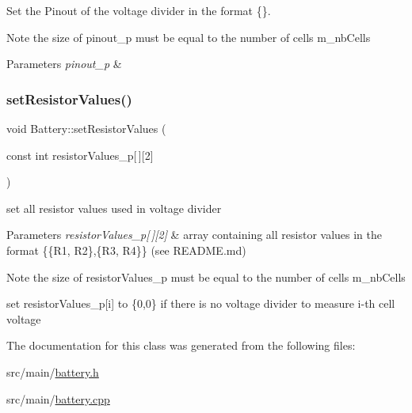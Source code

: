 Set the Pinout of the voltage divider in the format \{\}. 

\begin{DoxyNote}{Note}
the size of pinout\+\_\+p must be equal to the number of cells m\+\_\+nb\+Cells 
\end{DoxyNote}

\begin{DoxyParams}{Parameters}
{\em pinout\+\_\+p} & \\
\hline
\end{DoxyParams}
\mbox{\label{class_battery_afb257ecd2eab7ed446d15ea9e78cc074}} 
\subsubsection{\texorpdfstring{set\+Resistor\+Values()}{setResistorValues()}}
{\footnotesize\ttfamily void Battery\+::set\+Resistor\+Values (\begin{DoxyParamCaption}\item[{const int}]{resistor\+Values\+\_\+p\mbox{[}$\,$\mbox{]}\mbox{[}2\mbox{]} }\end{DoxyParamCaption})}



set all resistor values used in voltage divider 


\begin{DoxyParams}{Parameters}
{\em resistor\+Values\+\_\+p\mbox{[}$\,$\mbox{]}\mbox{[}2\mbox{]}} & array containing all resistor values in the format \{\{R1, R2\},\{R3, R4\}\} (see R\+E\+A\+D\+M\+E.\+md) \\
\hline
\end{DoxyParams}
\begin{DoxyNote}{Note}
the size of resistor\+Values\+\_\+p must be equal to the number of cells m\+\_\+nb\+Cells 

set resistor\+Values\+\_\+p\mbox{[}i\mbox{]} to \{0,0\} if there is no voltage divider to measure i-\/th cell voltage 
\end{DoxyNote}


The documentation for this class was generated from the following files\+:\begin{DoxyCompactItemize}
\item 
src/main/\hyperlink{battery_8h}{battery.\+h}\item 
src/main/\hyperlink{battery_8cpp}{battery.\+cpp}\end{DoxyCompactItemize}
